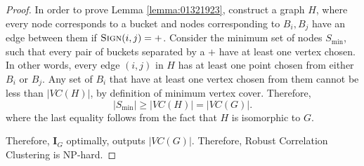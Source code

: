 \begin{proof}
In order to prove Lemma \ref{lemma:01321923}, construct a graph $H$, where every node corresponds to a bucket and nodes corresponding to $B_i,B_j$ have an edge between them if $\textsc{Sign} (i,j) = +$. Consider the minimum set of nodes $S_{\min}$, such that every pair of buckets separated by a $+$ have at least one vertex chosen. In other words, every edge $(i,j)$ in $H$ has at least one point chosen from either $B_i$ or $B_j$. Any set of $B_i$ that have at least one vertex chosen from them cannot be less than $|VC(H)|$, by definition of minimum vertex cover. Therefore,
\begin{equation*}
	|S_{\min}| \ge |VC(H)| = |VC(G)|.
\end{equation*}
where the last equality follows from the fact that $H$ is isomorphic to $G$.


Therefore, $\mathbf{I}_G$ optimally, outputs $|VC(G)|$. Therefore, Robust Correlation Clustering is NP-hard.


\end{proof}